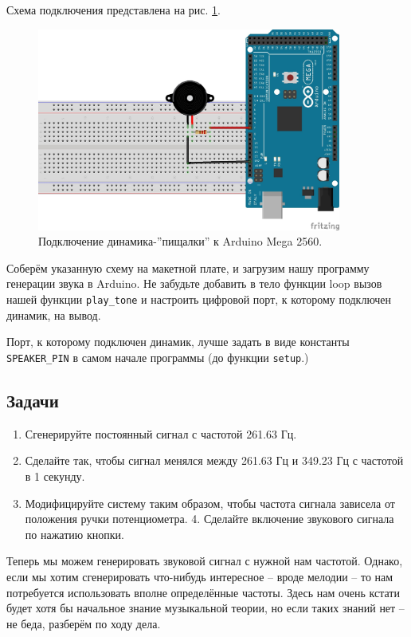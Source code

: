 \documentclass[a4paper,twoside]{book}
\begin{document}
Схема подключения представлена на рис. \ref{fig:sound-fig-2}.

\begin{figure}[h]
  \caption{Подключение динамика-''пищалки'' к Arduino Mega 2560.}
  \label{fig:sound-fig-2}
  \includegraphics[width=10cm]{sound-fig-2}
  \centering
\end{figure}

Соберём указанную схему на макетной плате, и загрузим нашу программу генерации
звука в Arduino. Не забудьте добавить в тело функции loop вызов нашей функции
\texttt{play\_tone} и настроить цифровой порт, к которому подключен динамик, на
вывод.

Порт, к которому подключен динамик, лучше задать в виде константы
\texttt{SPEAKER\_PIN} в самом начале программы (до функции \texttt{setup}.)

\subsection{Задачи}
\begin{enumerate}
\item Сгенерируйте постоянный сигнал с частотой 261.63 Гц.
\item Сделайте так, чтобы сигнал менялся между 261.63 Гц и 349.23 Гц с частотой
  в 1 секунду. 
\item Модифицируйте систему таким образом, чтобы частота сигнала зависела от
  положения ручки потенциометра. 4. Сделайте включение звукового сигнала по
  нажатию кнопки.
\end{enumerate}

Теперь мы можем генерировать звуковой сигнал с нужной нам частотой. Однако, если
мы хотим сгенерировать что-нибудь интересное -- вроде мелодии -- то нам
потребуется использовать вполне определённые частоты. Здесь нам очень кстати
будет хотя бы начальное знание музыкальной теории, но если таких знаний нет --
не беда, разберём по ходу дела.
\end{document}
